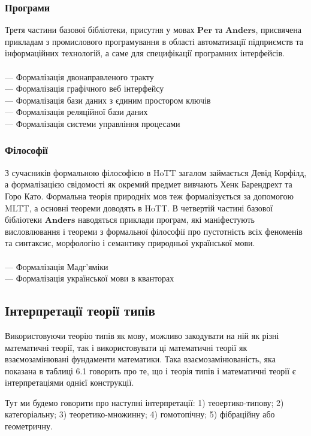 \newpage
\subsubsection{Програми}

Третя частини базової бібліотеки, присутня у мовах $\mathbf{Per}$ та $\mathbf{Anders}$,
присвячена прикладам з промислового програмування в області автоматизації
підприємств та інформаційних технологій, а саме для специфікації програмних інтерфейсів.
\\
\\
\noindent --- Формалізація двонаправленого тракту \\
--- Формалізація графічного веб інтерфейсу \\
--- Формалізація бази даних з єдиним простором ключів \\
--- Формалізація реляційної бази даних \\
--- Формалізація системи управління процесами \\

\subsubsection{Філософії}

З сучасників формальною філософією в HoTT загалом займається Девід Корфілд,
а формалізацією свідомості як окремий предмет вивчають Хенк Барендрехт та Горо Като.
Формальна теорія природніх мов теж формалізується за допомогою MLTT,
а основні теореми доводять в HoTT. В четвертій частині базової
бібліотеки $\mathbf{Anders}$ наводяться приклади програм, які
маніфестують висловлювання і теореми з формальної філософії про пустотність
всіх феноменів та синтаксис, морфологію і семантику природньої української мови.
\\
\\
\noindent
--- Формалізація Мадг'яміки \\
--- Формалізація української мови в кванторах
\newpage
\subsection{Інтерпретації теорії типів}
Використовуючи теорію типів як мову, можливо закодувати на ній як
різні математичні теорії, так і використовувати ці математичні
теорії як взаємозамінювані фундаменти математики.
Така взаємозамінюваність, яка показана в таблиці 6.1 говорить про те,
що і теорія типів і математичні теорії є інтерпретаціями однієї конструкції.

Тут ми будемо говорити про наступні інтерпретації:
1) теоертико-типову;
2) категоріальну;
3) теоретико-множинну;
4) гомотопічну;
5) фібраційну або геометричну.

